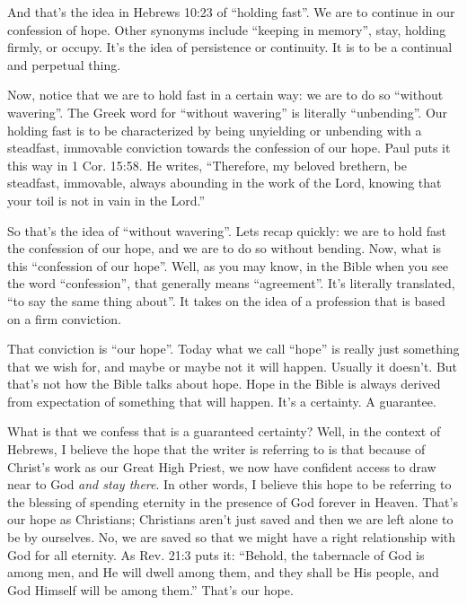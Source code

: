 \documentclass[letterpaper, 12pt]{article}
\begin{document}
    And that's the idea in Hebrews 10:23 of ``holding fast''. We are to
    continue in our confession of hope. Other synonyms include ``keeping
    in memory'', stay, holding firmly, or occupy. It's the idea of
    persistence or continuity. It is to be a continual and perpetual
    thing.

    Now, notice that we are to hold fast in a certain way: we are to do
    so ``without wavering''. The Greek word for ``without wavering'' is
    literally ``unbending''. Our holding fast is to be characterized by
    being unyielding or unbending with a steadfast, immovable conviction
    towards the confession of our hope. Paul puts it this way in 1 Cor.
    15:58. He writes, ``Therefore, my beloved brethern, be steadfast,
    immovable, always abounding in the work of the Lord, knowing that
    your toil is not in vain in the Lord.''

    So that's the idea of ``without wavering''. Lets recap quickly: we are to hold fast
    the confession of our hope, and we are to do so without bending.
    Now, what is this ``confession of our hope''. Well, as you may know,
    in the Bible when you see the word ``confession'', that generally
    means ``agreement''. It's literally translated, ``to say the same
    thing about''. It takes on the idea of a profession that is based on a firm conviction. 

    That conviction is ``our hope''. Today what we call ``hope'' is
    really just something that we wish for, and maybe or maybe not it
    will happen. Usually it doesn't. But that's not how the Bible talks
    about hope. Hope in the Bible is always derived from expectation of
    something that will happen. It's a certainty. A guarantee. 

    What is that we confess that is a guaranteed certainty? Well, in the
    context of Hebrews, I believe the hope that the writer is referring
    to is that because of Christ's work as our Great High Priest, we now
    have confident access to draw near to God \emph{and stay there}. In
    other words, I believe this hope to be referring to the blessing of
    spending eternity in the presence of God forever in Heaven. That's
    our hope as Christians; Christians aren't just saved and then we are
    left alone to be by ourselves. No, we are saved so that we might
    have a right relationship with God for all eternity. As Rev. 21:3
    puts it: ``Behold, the tabernacle of God is among men, and He will
    dwell among them, and they shall be His people, and God Himself will
    be among them.'' That's our hope.
\end{document}
